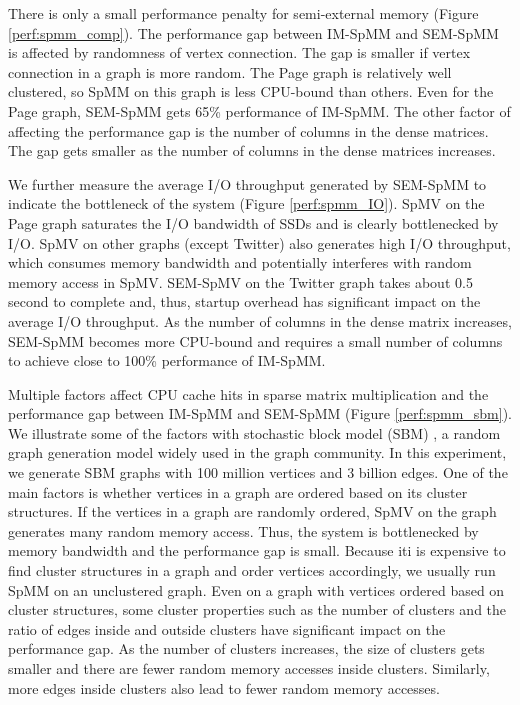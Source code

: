 There is only a small performance penalty for semi-external memory (Figure
\ref{perf:spmm_comp}). The performance gap between IM-SpMM and SEM-SpMM
is affected by randomness of vertex connection. The gap is smaller if
vertex connection in a graph is more random. The Page graph is relatively
well clustered, so SpMM on this graph is less CPU-bound than others.
Even for the Page graph, SEM-SpMM gets 65\% performance of IM-SpMM.
The other factor of affecting the performance gap is the number of columns
in the dense matrices. The gap gets smaller as the number of columns in
the dense matrices increases.

We further measure the average I/O throughput generated by SEM-SpMM to indicate
the bottleneck of the system (Figure \ref{perf:spmm_IO}). SpMV on the Page
graph saturates the I/O bandwidth of SSDs and is clearly bottlenecked by I/O.
SpMV on other graphs (except Twitter) also generates high I/O throughput,
which consumes memory bandwidth and potentially interferes with random memory
access in SpMV. SEM-SpMV on the Twitter graph takes about 0.5 second to
complete and,
thus, startup overhead has significant impact on the average I/O throughput.
As the number of columns in the dense matrix increases, SEM-SpMM becomes more
CPU-bound and requires a small number of columns to achieve close to 100\%
performance of IM-SpMM.

Multiple factors affect CPU cache hits in sparse matrix multiplication and
the performance gap between IM-SpMM and SEM-SpMM (Figure \ref{perf:spmm_sbm}).
We illustrate some of the factors with stochastic
block model (SBM) \cite{sussman12}, a random graph
generation model widely used in the graph community. In this experiment, we
generate SBM graphs with 100 million vertices and 3 billion edges.
One of the main factors is whether vertices in a graph are ordered
based on its cluster structures. If the vertices in a graph are randomly ordered,
SpMV on the graph generates many random memory access. Thus, the system is
bottlenecked by memory bandwidth and the performance gap is small. Because iti
is expensive to find cluster structures in a graph and order vertices accordingly,
we usually run
SpMM on an unclustered graph. Even on a graph with vertices ordered based on
cluster structures, some cluster properties such as the number of clusters and
the ratio of edges inside and outside clusters have significant impact on
the performance gap.
As the number of clusters increases, the size of clusters gets smaller and
there are fewer random memory accesses inside clusters. Similarly, more
edges inside clusters also lead to fewer random memory accesses.


